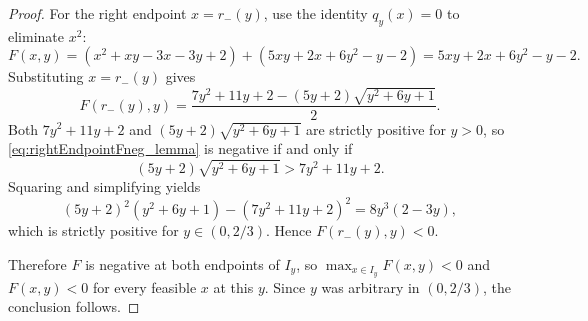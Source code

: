 \documentclass[11pt]{article}
\begin{document}
\begin{proof}
For the right endpoint $x=r_-(y)$, use the identity $q_y(x)=0$ to eliminate $x^2$:
\[
F(x,y)=(x^2+xy-3x-3y+2) + (5xy+2x+6y^2-y-2)=5xy+2x+6y^2-y-2.
\]
Substituting $x=r_-(y)$ gives
\begin{equation}\label{eq:rightEndpointFneg_lemma}
F(r_-(y),y)=\frac{7y^2+11y+2-(5y+2)\sqrt{y^2+6y+1}}{2}.
\end{equation}
Both $7y^2+11y+2$ and $(5y+2)\sqrt{y^2+6y+1}$ are strictly positive for $y>0$,
so \eqref{eq:rightEndpointFneg_lemma} is negative if and only if
\[
(5y+2)\sqrt{y^2+6y+1}>7y^2+11y+2.
\]
Squaring and simplifying yields
\begin{equation}\label{eq:squareDiffFneg_lemma}
(5y+2)^2(y^2+6y+1)-(7y^2+11y+2)^2
=8y^3(2-3y),
\end{equation}
which is strictly positive for $y\in(0,2/3)$. Hence $F(r_-(y),y)<0$.

Therefore $F$ is negative at both endpoints of $I_y$, so $\max_{x\in I_y}F(x,y)<0$ and
$F(x,y)<0$ for every feasible $x$ at this $y$. Since $y$ was arbitrary in $(0,2/3)$, the conclusion follows.
\end{proof}
\end{document}
